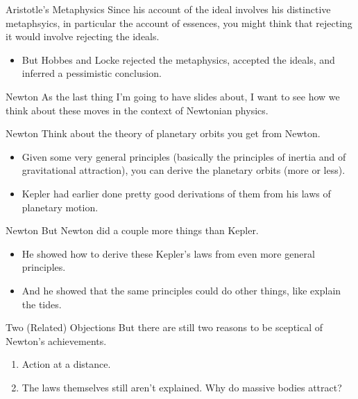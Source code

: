 \documentclass[
  17pt,
  letterpaper,
  ignorenonframetext,
  aspectratio=169,
]{beamer}
\providecommand{\tightlist}{%
  \setlength{\itemsep}{0pt}\setlength{\parskip}{0pt}}\usepackage{longtable,booktabs,array}
\begin{document}
\begin{frame}{Aristotle's Metaphysics}
\protect\hypertarget{aristotles-metaphysics}{}
Since his account of the ideal involves his distinctive metaphsyics, in
particular the account of essences, you might think that rejecting it
would involve rejecting the ideals.

\begin{itemize}[<+->]
\tightlist
\item
  But Hobbes and Locke rejected the metaphysics, accepted the ideals,
  and inferred a pessimistic conclusion.
\end{itemize}
\end{frame}

\begin{frame}{Newton}
\protect\hypertarget{newton}{}
As the last thing I'm going to have slides about, I want to see how we
think about these moves in the context of Newtonian physics.
\end{frame}

\begin{frame}{Newton}
\protect\hypertarget{newton-1}{}
Think about the theory of planetary orbits you get from Newton.

\begin{itemize}[<+->]
\tightlist
\item
  Given some very general principles (basically the principles of
  inertia and of gravitational attraction), you can derive the planetary
  orbits (more or less).
\item
  Kepler had earlier done pretty good derivations of them from his laws
  of planetary motion.
\end{itemize}
\end{frame}

\begin{frame}{Newton}
\protect\hypertarget{newton-2}{}
But Newton did a couple more things than Kepler.

\begin{itemize}[<+->]
\tightlist
\item
  He showed how to derive these Kepler's laws from even more general
  principles.
\item
  And he showed that the same principles could do other things, like
  explain the tides.
\end{itemize}
\end{frame}

\begin{frame}{Two (Related) Objections}
\protect\hypertarget{two-related-objections}{}
But there are still two reasons to be sceptical of Newton's
achievements.

\begin{enumerate}[<+->]
\tightlist
\item
  Action at a distance.
\item
  The laws themselves still aren't explained. Why do massive bodies
  attract?
\end{enumerate}
\end{frame}
\end{document}
